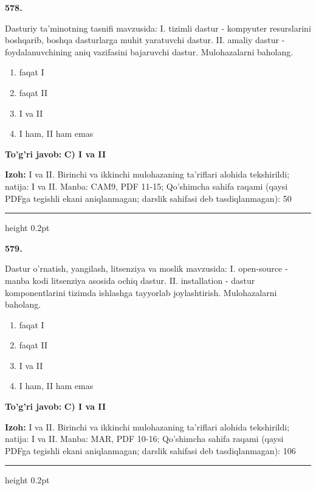 \documentclass[10pt,a4paper]{article}
\begin{document}
{\bfseries\sffamily\color{ink} 578.}
\par
Dasturiy ta'minotning tasnifi mavzusida: I. tizimli dastur - kompyuter resurslarini boshqarib, boshqa dasturlarga muhit yaratuvchi dastur. II. amaliy dastur - foydalanuvchining aniq vazifasini bajaruvchi dastur. Mulohazalarni baholang.
\begin{enumerate}[label=\Alph*),leftmargin=9mm]
\item faqat I
\item faqat II
\item I va II
\item I ham, II ham emas
\end{enumerate}
\begin{tcolorbox}[enhanced,breakable,colback=teal!4,colframe=teal!60!black,boxrule=0.45pt,arc=1.2mm,left=2.7mm,right=2.7mm,top=1.8mm,bottom=1.8mm,before skip=2mm,after skip=2mm]
{\bfseries\sffamily\color{teal}To'g'ri javob:} \textbf{C) I va II}
\par\smallskip
{\bfseries Izoh:} I va II. Birinchi va ikkinchi mulohazaning ta'riflari alohida tekshirildi; natija: I va II. Manba: CAM9, PDF 11-15; Qo'shimcha sahifa raqami (qaysi PDFga tegishli ekani aniqlanmagan; darslik sahifasi deb tasdiqlanmagan): 50
\end{tcolorbox}
\vspace{2mm}\hrule height 0.2pt\vspace{3mm}

{\bfseries\sffamily\color{ink} 579.}
\par
Dastur o'rnatish, yangilash, litsenziya va moslik mavzusida: I. open-source - manba kodi litsenziya asosida ochiq dastur. II. installation - dastur komponentlarini tizimda ishlashga tayyorlab joylashtirish. Mulohazalarni baholang.
\begin{enumerate}[label=\Alph*),leftmargin=9mm]
\item faqat I
\item faqat II
\item I va II
\item I ham, II ham emas
\end{enumerate}
\begin{tcolorbox}[enhanced,breakable,colback=teal!4,colframe=teal!60!black,boxrule=0.45pt,arc=1.2mm,left=2.7mm,right=2.7mm,top=1.8mm,bottom=1.8mm,before skip=2mm,after skip=2mm]
{\bfseries\sffamily\color{teal}To'g'ri javob:} \textbf{C) I va II}
\par\smallskip
{\bfseries Izoh:} I va II. Birinchi va ikkinchi mulohazaning ta'riflari alohida tekshirildi; natija: I va II. Manba: MAR, PDF 10-16; Qo'shimcha sahifa raqami (qaysi PDFga tegishli ekani aniqlanmagan; darslik sahifasi deb tasdiqlanmagan): 106
\end{tcolorbox}
\vspace{2mm}\hrule height 0.2pt\vspace{3mm}
\end{document}
